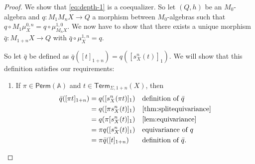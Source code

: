 \documentclass[a4paper,UKenglish,cleveref,thm-restate,numberwithinsect,final]{lipics-v2021}
\newcommand{\Perm}{\mathsf{Perm}(\Names)}
\newcommand{\Term}{\mathsf{Term}}
\newcommand{\sig}{\Sigma}
\newcommand{\Names}{\mathbb{A}}
\theoremstyle{plain}
\numberwithin{equation}{section}
\newcommand{\+}[1]{\mathcal{#1}\xspace}
\theoremstyle{definition}
\begin{document}
\begin{proof}
    We show that \eqref{eq:depth-1} is a coequalizer.
    So let \((Q, h)\) be an \(M_0\)-algebra and
    \(q: M_1 M_n X \to Q\) a morphism between \(M_0\)-algebras such
    that \(q \circ M_1 \mu^{0, n}_X = q \circ \mu^{1, 0}_{M_n X}\).
    We now have to show that there exists a unique morphism
    \(\bar{q}: M_{1 + n} X \to Q\) with
    \(\bar{q} \circ \mu^{1, n}_X = q\).

    So let \(\bar{q}\) be defined as \(\bar{q}([t]_{1 + n}) = q([s^n_X(t)]_1)\).
    We will show that this definition satisfies our requirements:
    \begin{enumerate}[wide]
        \item \label{itm:coequalizerequivariance}
            If \(\pi \in \Perm\) and \(t \in \Term_{\sig, 1 + n}(X)\), then
            \begin{align*}
                \bar{q}([\pi t]_{1 + n})
                &= q([s^n_X(\pi t)]_1) && \text{definition of } \bar{q} \\
                &= q([\pi s^n_X(t)]_1) && \text{\cref{thm:splitequivariance}} \\
                &= q(\pi[s^n_X(t)]_1) && \text{\cref{lem:equivariance}} \\
                &= \pi q([s^n_X(t)]_1) && \text{equivariance of } q \\
                &= \pi \bar{q}([t]_{1 + n}) && \text{definition of } \bar{q}.
            \end{align*}


\end{enumerate}
\end{proof}
\end{document}
